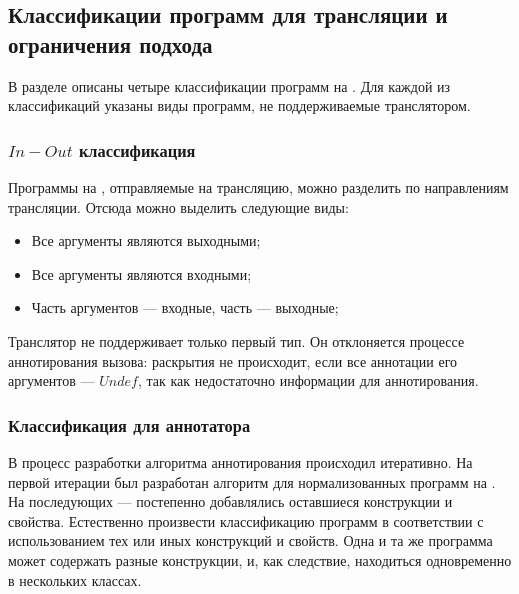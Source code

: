 \subsection{Классификации программ для трансляции и ограничения подхода}

В разделе описаны четыре классификации программ на \miniKanren{}.
Для каждой из классификаций указаны виды программ, не поддерживаемые транслятором.


\subsubsection{$In-Out$ классификация}

Программы на \miniKanren{}, отправляемые на трансляцию, можно разделить по направлениям трансляции.
Отсюда можно выделить следующие виды:
\begin{itemize}
    \item Все аргументы являются выходными;
    \item Все аргументы являются входными;
    \item Часть аргументов --- входные, часть --- выходные;
\end{itemize}

Транслятор не поддерживает только первый тип.
Он отклоняется процессе аннотирования вызова: раскрытия не происходит, если все аннотации его аргументов --- $Undef$, так как недостаточно информации для аннотирования.


\subsubsection{Классификация для аннотатора}

В процесс разработки алгоритма аннотирования происходил итеративно.
На первой итерации был разработан алгоритм для нормализованных программ на \miniKanren{}.
На последующих --- постепенно добавлялись оставшиеся конструкции \miniKanren{} и свойства.
Естественно произвести классификацию программ в соответствии с использованием тех или иных конструкций и свойств.
Одна и та же программа может содержать разные конструкции, и, как следствие, находиться одновременно в нескольких классах.

